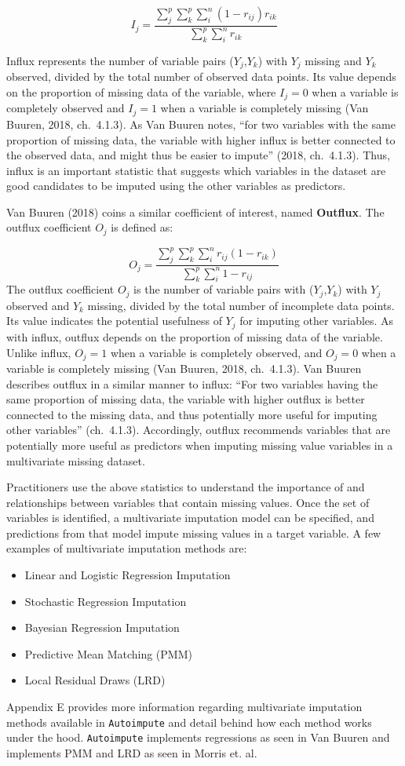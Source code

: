 \documentclass[12pt,oneside]{chicagocapstone}
\providecommand{\tightlist}{%
  \setlength{\itemsep}{0pt}\setlength{\parskip}{0pt}}
\begin{document}
\[I_j = \frac{\sum_j^p\sum_k^p\sum_i^n (1-r_{ij})r_{ik}}{\sum_k^p\sum_i^n r_{ik}}\]

Influx represents the number of variable pairs (\(Y_j\),\(Y_k\)) with
\(Y_j\) missing and \(Y_k\) observed, divided by the total number of
observed data points. Its value depends on the proportion of missing
data of the variable, where \(I_j=0\) when a variable is completely
observed and \(I_j=1\) when a variable is completely missing (Van
Buuren, 2018, ch.~4.1.3). As Van Buuren notes, ``for two variables with
the same proportion of missing data, the variable with higher influx is
better connected to the observed data, and might thus be easier to
impute'' (2018, ch.~4.1.3). Thus, influx is an important statistic that
suggests which variables in the dataset are good candidates to be
imputed using the other variables as predictors.

Van Buuren (2018) coins a similar coefficient of interest, named
\textbf{Outflux}. The outflux coefficient \(O_j\) is defined as:

\[O_j = \frac{\sum_j^p\sum_k^p\sum_i^n r_{ij}(1-r_{ik})}{\sum_k^p\sum_i^n 1-r_{ij}}\]
The outflux coefficient \(O_j\) is the number of variable pairs with
(\(Y_j\),\(Y_k\)) with \(Y_j\) observed and \(Y_k\) missing, divided by
the total number of incomplete data points. Its value indicates the
potential usefulness of \(Y_j\) for imputing other variables. As with
influx, outflux depends on the proportion of missing data of the
variable. Unlike influx, \(O_j=1\) when a variable is completely
observed, and \(O_j=0\) when a variable is completely missing (Van
Buuren, 2018, ch.~4.1.3). Van Buuren describes outflux in a similar
manner to influx: ``For two variables having the same proportion of
missing data, the variable with higher outflux is better connected to
the missing data, and thus potentially more useful for imputing other
variables'' (ch.~4.1.3). Accordingly, outflux recommends variables that
are potentially more useful as predictors when imputing missing value
variables in a multivariate missing dataset.

Practitioners use the above statistics to understand the importance of
and relationships between variables that contain missing values. Once
the set of variables is identified, a multivariate imputation model can
be specified, and predictions from that model impute missing values in a
target variable. A few examples of multivariate imputation methods are:
\begin{itemize}
\tightlist
\item
  Linear and Logistic Regression Imputation
\item
  Stochastic Regression Imputation
\item
  Bayesian Regression Imputation
\item
  Predictive Mean Matching (PMM)
\item
  Local Residual Draws (LRD)
\end{itemize}
Appendix E provides more information regarding multivariate imputation
methods available in \texttt{Autoimpute} and detail behind how each
method works under the hood. \texttt{Autoimpute} implements regressions
as seen in Van Buuren and implements PMM and LRD as seen in Morris et.
al.
\end{document}
